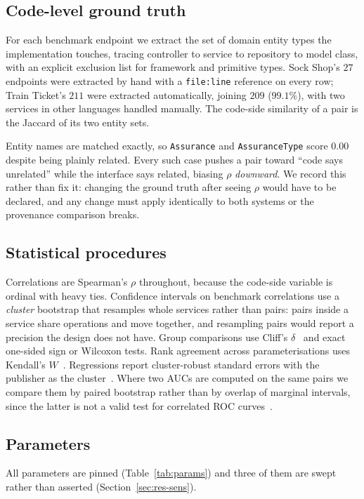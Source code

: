 \documentclass[journal]{IEEEtran}
\newcommand{\code}[1]{\texttt{\small #1}}
\begin{document}
\subsection{Code-level ground truth}
For each benchmark endpoint we extract the set of domain entity types the
implementation touches, tracing controller to service to repository to model
class, with an explicit exclusion list for framework and primitive types. Sock
Shop's $27$ endpoints were extracted by hand with a \code{file:line} reference on
every row; Train Ticket's $211$ were extracted automatically, joining $209$
($99.1\%$), with two services in other languages handled manually. The code-side
similarity of a pair is the Jaccard of its two entity sets.

Entity names are matched exactly, so \code{Assurance} and \code{AssuranceType}
score $0.00$ despite being plainly related. Every such case pushes a pair toward
``code says unrelated'' while the interface says related, biasing $\rho$
\emph{downward}. We record this rather than fix it: changing the ground truth
after seeing $\rho$ would have to be declared, and any change must apply
identically to both systems or the provenance comparison breaks.

\subsection{Statistical procedures}
Correlations are Spearman's $\rho$ throughout, because the code-side variable is
ordinal with heavy ties. Confidence intervals on benchmark correlations use a
\emph{cluster} bootstrap that resamples whole services rather than pairs: pairs
inside a service share operations and move together, and resampling pairs would
report a precision the design does not have. Group comparisons use Cliff's
$\delta$~\cite{cliff1993dominance} and exact one-sided sign or Wilcoxon tests.
Rank agreement across parameterisations uses Kendall's
$W$~\cite{kendall1939problem}. Regressions report cluster-robust standard errors
with the publisher as the cluster~\cite{cameron2011robust}. Where two AUCs are
computed on the same pairs we compare them by paired bootstrap rather than by
overlap of marginal intervals, since the latter is not a valid test for
correlated ROC curves~\cite{delong1988comparing}.

\subsection{Parameters}
All parameters are pinned (Table~\ref{tab:params}) and three of them are swept
rather than asserted (Section~\ref{sec:res-sens}).
\end{document}
